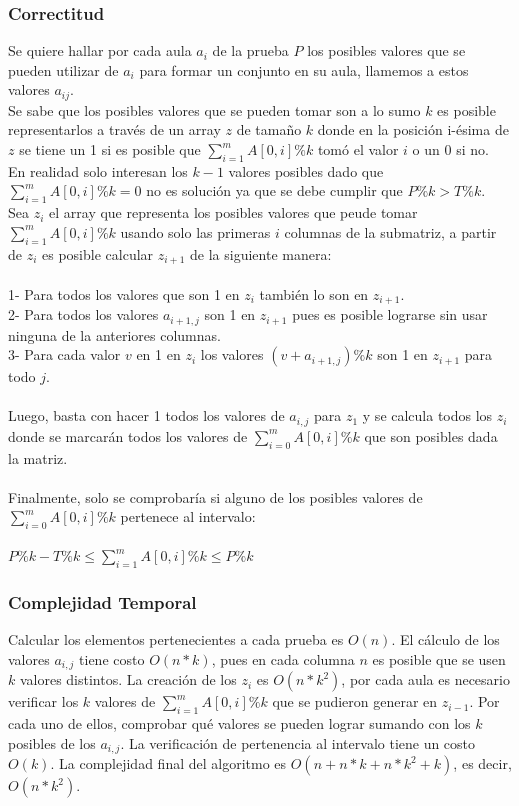 \documentclass{article}
\begin{document}
\subsubsection{Correctitud}
Se quiere hallar por cada aula $a_{i}$ de la prueba $P$ los posibles valores que se pueden utilizar de $a_{i}$ para formar un conjunto en su aula, llamemos a estos valores $a_{ij}$.
\\
Se sabe que los posibles valores que se pueden tomar son a lo sumo $k$ es posible representarlos a través de un array $z$ de tamaño $k$ donde en la posición i-ésima de $z$ se tiene un 1 si es posible que $\sum_{i=1}^{m} A[0,i] \% k$ tomó el valor $i$ o un 0 si no.
\\
En realidad solo interesan los $k-1$ valores posibles dado que $\sum_{i=1}^{m} A[0,i] \% k = 0$ no es solución ya que se debe cumplir que $P \% k > T\% k$.
\\
Sea $z_{i}$ el array que representa los posibles valores que peude tomar $\sum_{i=1}^{m} A[0,i] \% k$ usando solo las primeras $i$ columnas de la submatriz, a partir de $z_{i}$ es posible calcular $z_{i+1}$ de la siguiente manera:
\\
\\
1- Para todos los valores que son 1 en $z_{i}$ también lo son en $z_{i+1}$.
\\
2- Para todos los valores $a_{i+1, j}$ son 1 en $z_{i+1}$ pues es posible lograrse sin usar ninguna de la anteriores columnas.
\\
3- Para cada valor $v$ en 1 en $z_{i}$ los valores $(v + a_{i+1,j}) \% k$ son 1 en $z_{i+1}$ para todo $j$.
\\
\\
Luego, basta con hacer 1 todos los valores de $a_{i,j}$ para $z_{1}$ y se calcula todos los $z_{i}$ donde se marcarán todos los valores de $\sum_{i=0}^{m} A[0,i]\%k$ que son posibles dada la matriz.
\\
\\
Finalmente, solo se comprobaría si alguno de los posibles valores de $\sum_{i=0}^{m} A[0,i]\%k$ pertenece al intervalo:
\\
\\
$P\%k - T\%k \leq \sum_{i=1}^{m} A[0,i]\% k \leq P\%k$

\subsubsection{Complejidad Temporal}
Calcular los elementos pertenecientes a cada prueba es $O(n)$. El cálculo de los valores $a_{i,j}$ tiene costo $O(n*k)$, pues en cada columna $n$ es posible que se usen $k$ valores distintos. La creación de los $z_{i}$ es $O(n*k^2)$, por cada aula es necesario verificar los $k$ valores de $\sum_{i=1}^{m} A[0,i]\% k$ que se pudieron generar en $z_{i-1}$. Por cada uno de ellos, comprobar qué valores se pueden lograr sumando con los $k$ posibles de los $a_{i,j}$. La verificación de pertenencia al intervalo tiene un costo $O(k)$. La complejidad final del algoritmo es $O(n + n*k + n*k^2 + k)$, es decir, $O(n*k^2)$.
\end{document}
